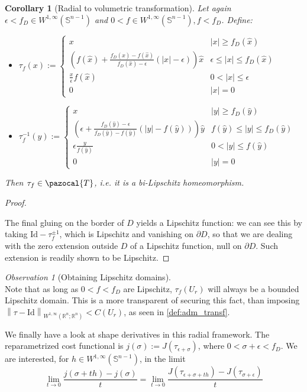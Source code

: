 \documentclass[english,a4paper,9pt,oneside]{scrbook}	%
\theoremstyle{break}
\newtheorem{cor}[equation]{Corollary}
\newenvironment{mproof}[1][\proofname]{%
  \begin{proof}[#1]$ $\par\nobreak\ignorespaces
}{%
  \end{proof}
}
\renewcommand*{\proofname}{Proof}
\theoremstyle{remark}
\newtheorem{obs}[equation]{Observation}
\newcommand{\mR}{\mathbb{R}}
\newcommand{\mS}{\mathbb{S}^{n-1}}
\newcommand{\ds}{\displaystyle}
\newcommand{\norm}[1]{\left\lVert#1\right\rVert}
\newcommand{\cT}{\pazocal{T}}
\newcommand{\id}{\text{Id}}
\newcommand{\xh}{\hat{x}}
\newcommand{\yh}{\hat{y}}
\newcommand{\eps}{\epsilon}
\begin{document}
\begin{cor}[Radial to volumetric transformation]
\label{cor:star_shaped_transformation}
Let again $\eps <f_D \in W^{1,\infty}(\mS)$ and $0<f \in W^{1,\infty}(\mS), f<f_D$. Define:

\begin{itemize}
	\item $\ds \tau_f(x):=\left\{\begin{matrix}
 x & |x|\geq f_D(\xh)\\ 
 \left (  f(\xh)+\frac{f_D(\xh)-f(\xh)}{f_D(\xh)-\eps}(|x|-\eps) \right )\xh & \eps \leq |x| \leq f_D(\xh) \\ 
 \frac{x}{\epsilon}f(\hat{x}) & 0<|x|\leq \eps\\ 
 0 & |x|=0
\end{matrix}\right.$

	\item $\ds \tau_f^{-1}(y):=\left\{\begin{matrix}
 x & |y|\geq f_D(\yh)\\ 
 \left (  \eps+\frac{f_D(\yh)-\eps}{f_D(\yh)-f(\yh)}(|y|-f(\yh)) \right )\yh & f(\yh) \leq |y| \leq f_D(\yh) \\ 
 \epsilon \frac{y}{f(\hat{y})}& 0<|y|\leq f(\yh)\\ 
 0 & |y|=0
\end{matrix}\right.$
\end{itemize}


Then $\tau_f \in \cT$, i.e. it is a bi-Lipschitz homeomorphism.
\end{cor}
\begin{mproof}

The final gluing on the border of $D$ yields a Lipschitz function: we can see this by taking $\id -\tau_f^{\pm 1}$, which is Lipschitz and vanishing on $\partial D$, so that we are dealing with the zero extension outside $D$ of a Lipschitz function, null on $\partial D$. Such extension is readily shown to be Lipschitz.
\end{mproof}

\begin{obs}[Obtaining Lipschitz domains]
\mbox{} \\
Note that as long as $0<f<f_D$ are Lipschitz, $\tau_f(U_r)$ will always be a bounded Lipschitz domain. This is a more transparent of securing this fact, than imposing $\norm{\tau-\id}_{W^{1,\infty}(\mR^n;\mR^n)}< C(U_r)$, as seen in \cref{def:adm_transf}.
\end{obs}

We finally have a look at shape derivatives in this radial framework. The reparametrized cost functional is $j(\sigma):=J(\tau_{\eps+\sigma})$, where $0<\sigma+\eps < f_D$. We are interested, for $h\in W^{1, \infty}(\mS)$, in the limit $$\lim_{t\rightarrow 0}\frac{j(\sigma+th)-j(\sigma)}{t}=\lim_{t\rightarrow 0}\frac{J(\tau_{\eps+\sigma+th})-J(\tau_{\sigma+\eps})}{t}$$
\end{document}
